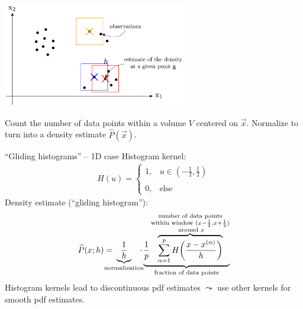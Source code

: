 \begin{frame}{\subsecname}
	
\begin{center}
	\includegraphics[width=0.6\textwidth]{./img/section1_fig1}
\end{center}

Count the number of data points within a volume $V$ centered on $\vec{x}$.
Normalize to turn into a density estimate $\widehat{P}(\vec{x})$.

\end{frame}

\begin{frame}[t]{``Gliding histograms'' -- 1D case}
\small
\vspace{-0.3cm}
Histogram kernel:
\begin{equation*}
\begin{array}{ll}
H({u}) = \left \{ \begin{array}{ll}
1, & u \in (-\frac{1}{2}, \frac{1}{2}) \\\\
0, & \text{else}
\end{array} \right.
\end{array}
\end{equation*}
Density estimate (``gliding histogram''):
\vspace{-0.3cm}
\begin{equation*}
	\widehat{P}({x};h) = 
	 \kern-3ex \underbrace{ \frac{1}{h}}_{
	\substack{ \text{normalization}}}
	 \kern-1.5ex 
\cdot \underbrace{ \frac{1}{p} 
	\overbrace{ \sum\limits_{\alpha = 1}^p
		H \bigg( \frac{{x} - {x}^{(\alpha)}}{
			h} \bigg) }^{
		\substack{\text{number of data points}\\
			\text{within window } (x-\frac{1}{2}, x+\frac{1}{2}) \\
			\text{ around } {x}}} }_{
	\text{fraction of data points}}
\end{equation*}
Histogram kernels lead to discontinuous pdf estimates $\leadsto$ use other kernels for smooth pdf estimates. 
\end{frame}


